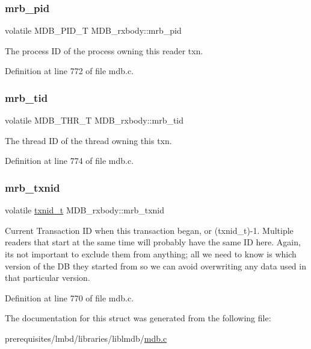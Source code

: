 \subsubsection{\texorpdfstring{mrb\+\_\+pid}{mrb\_pid}}
{\footnotesize\ttfamily volatile M\+D\+B\+\_\+\+P\+I\+D\+\_\+T M\+D\+B\+\_\+rxbody\+::mrb\+\_\+pid}

The process ID of the process owning this reader txn. 

Definition at line 772 of file mdb.\+c.

\mbox{\label{struct_m_d_b__rxbody_ab7aceed58454ea79f33c4bc5c201e6ec}} 
\subsubsection{\texorpdfstring{mrb\+\_\+tid}{mrb\_tid}}
{\footnotesize\ttfamily volatile M\+D\+B\+\_\+\+T\+H\+R\+\_\+T M\+D\+B\+\_\+rxbody\+::mrb\+\_\+tid}

The thread ID of the thread owning this txn. 

Definition at line 774 of file mdb.\+c.

\mbox{\label{struct_m_d_b__rxbody_ac88ac750e500b2080ab2fd379e1880fb}} 
\subsubsection{\texorpdfstring{mrb\+\_\+txnid}{mrb\_txnid}}
{\footnotesize\ttfamily volatile \mbox{\hyperlink{group__internal_gabbaef7c9c710f8652a62c32d748c040e}{txnid\+\_\+t}} M\+D\+B\+\_\+rxbody\+::mrb\+\_\+txnid}

Current Transaction ID when this transaction began, or (txnid\+\_\+t)-\/1. Multiple readers that start at the same time will probably have the same ID here. Again, it\textquotesingle{}s not important to exclude them from anything; all we need to know is which version of the DB they started from so we can avoid overwriting any data used in that particular version. 

Definition at line 770 of file mdb.\+c.



The documentation for this struct was generated from the following file\+:\begin{DoxyCompactItemize}
\item 
prerequisites/lmbd/libraries/liblmdb/\mbox{\hyperlink{mdb_8c}{mdb.\+c}}\end{DoxyCompactItemize}
